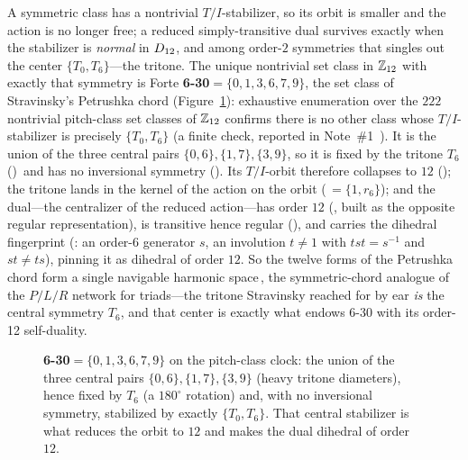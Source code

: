 A symmetric class has a nontrivial $T/I$-stabilizer, so its orbit is smaller and the action is no
longer free; a reduced simply-transitive dual survives exactly when the stabilizer is \emph{normal}
in $D_{12}$, and among order-$2$ symmetries that singles out the center $\{T_0,T_6\}$---the
tritone. The unique nontrivial set class in $\mathbb{Z}_{12}$ with exactly that symmetry is Forte
\textbf{6-30}$=\{0,1,3,6,7,9\}$, the set class of Stravinsky's Petrushka chord
(Figure~\ref{fig:p2-clock}): exhaustive enumeration over the $222$ nontrivial pitch-class set
classes of $\mathbb{Z}_{12}$ confirms there is no other class whose $T/I$-stabilizer is precisely
$\{T_0,T_6\}$ (a finite check, reported in Note~\#1~\cite{Note1}). It is the union of the three
central pairs $\{0,6\},\{1,7\},\{3,9\}$,
so it is fixed by the tritone $T_6$ ()\, and has no
inversional symmetry (). Its $T/I$-orbit therefore collapses to
$12$ (); the tritone lands in the kernel of the action on the orbit
(\,$=\{1,r_6\}$); and the dual---the centralizer of the reduced action---has order
$12$ (, built as the opposite regular representation), is transitive hence regular
(), and carries the dihedral fingerprint (: an
order-$6$ generator $s$, an involution $t\neq1$ with $tst=s^{-1}$ and $st\neq ts$), pinning it as
dihedral of order $12$. So the twelve forms of the Petrushka chord form a single navigable harmonic
space\,, the symmetric-chord analogue of the $P/L/R$ network for triads---the
tritone Stravinsky reached for by ear \emph{is} the central symmetry $T_6$, and that center is
exactly what endows 6-30 with its order-12 self-duality.

\begin{figure}[ht]
\centering
{}
\caption{\textbf{6-30}$=\{0,1,3,6,7,9\}$ on the pitch-class clock: the union of the three central
pairs $\{0,6\},\{1,7\},\{3,9\}$ (heavy tritone diameters), hence fixed by $T_6$ (a $180^\circ$
rotation) and, with no inversional symmetry, stabilized by exactly $\{T_0,T_6\}$. That central
stabilizer is what reduces the orbit to $12$ and makes the dual dihedral of order $12$.}
\label{fig:p2-clock}
\end{figure}

